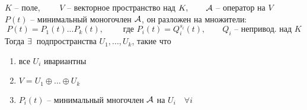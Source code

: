 \begin{theorem}
	$ K $ -- поле, $ \qquad V $ -- векторное пространство над $ K, \qquad \mathcal{A} $ -- оператор на $ V $ \\
	$ P(t) $ -- минимальный моногочлен $ \mathcal{A} $, он разложен на множители:
	$$ P(t) = P_1(t)...P_k(t), \qquad \text{ где } P_i(t) = Q_i^{s_i}(t), \qquad Q_i \text{ -- непривод. над } K $$
	Тогда $ \exists\, $ подпространства $ U_1, ..., U_k $, такие что
	\begin{enumerate}
		\item все $ U_i $ ивариантны
		\item $ V = U_1 \oplus ... \oplus U_k $
		\item $ P_i(t) $ -- минимальный многочлен $ \mathcal{A} $ на $ U_i \quad \forall i $
	\end{enumerate}
\end{theorem}


